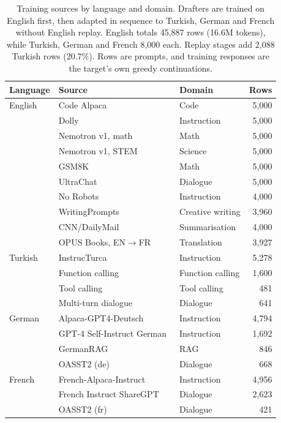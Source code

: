 \documentclass{article}
\begin{document}
\begin{table}[htbp]
\centering\small
\setlength{\tabcolsep}{3pt}
\caption{Training sources by language and domain. Drafters are trained on English first, then adapted in sequence to Turkish, German and French without English replay. English totals 45,887 rows (16.6M tokens), while Turkish, German and French 8,000 each. Replay stages add 2,088 Turkish rows (20.7\%). Rows are prompts, and training responses are the target's own greedy continuations.}
\label{tab:data}
\vskip 0.1in
\begin{tabular}{lllr}
\toprule
Language & Source & Domain & Rows \\
\midrule
English & Code Alpaca~\citep{chaudhary2023codealpaca} & Code & 5,000 \\
        & Dolly~\citep{conover2023dolly} & Instruction & 5,000 \\
        & Nemotron v1, math~\citep{nathawani2025nemotron} & Math & 5,000 \\
        & Nemotron v1, STEM~\citep{nathawani2025nemotron} & Science & 5,000 \\
        & GSM8K~\citep{cobbe2021gsm8k} & Math & 5,000 \\
        & UltraChat~\citep{ding2023ultrachat} & Dialogue & 5,000 \\
        & No Robots~\citep{norobots2023} & Instruction & 4,000 \\
        & WritingPrompts~\citep{fan2018writingprompts} & Creative writing & 3,960 \\
        & CNN/DailyMail~\citep{nallapati2016cnndm} & Summarisation & 4,000 \\
        & OPUS Books, EN$\rightarrow$FR~\citep{tiedemann2012opus} & Translation & 3,927 \\
\midrule
Turkish & InstrucTurca~\citep{instructurca2024} & Instruction & 5,278 \\
        & Function calling~\citep{atasoglu2024funccall} & Function calling & 1,600 \\
        & Tool calling~\citep{atasoglu2024toolcall} & Tool calling & 481 \\
        & Multi-turn dialogue~\citep{magibu2024multiturn} & Dialogue & 641 \\
\midrule
German  & Alpaca-GPT4-Deutsch~\citep{freedomintelligence2023alpacade} & Instruction & 4,794 \\
        & GPT-4 Self-Instruct German~\citep{causallmselfinstructgerman} & Instruction & 1,692 \\
        & GermanRAG~\citep{aurasgermanrag} & RAG & 846 \\
        & OASST2 (de)~\citep{openassistant2023oasst2} & Dialogue & 668 \\
\midrule
French  & French-Alpaca-Instruct & Instruction & 4,956 \\
        & French Instruct ShareGPT & Dialogue & 2,623 \\
        & OASST2 (fr)~\citep{openassistant2023oasst2} & Dialogue & 421 \\
\bottomrule
\end{tabular}
\end{table}
\end{document}
